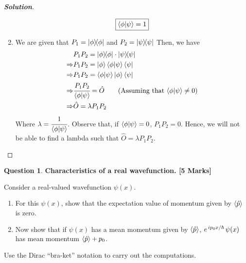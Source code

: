 \documentclass[10pt]{scrartcl}
\theoremstyle{definition}
\newtheorem{exercise}{Question}
\newenvironment{solution} {\begin{proof}[\normalfont \textbf{Solution}]} {\end{proof}}
\newcommand*{\OO}{\hat{O}}
\newcommand*{\Op}{\hat{p}}
\begin{document}
\begin{solution}
\begin{enumerate}[label={(\alph*)}]
            $$\boxed{\ip{\phi}{\psi} = 1}$$
        \item We are given that $P_1 = \op{\phi}$ and $P_2 = \op{\psi}{\psi}$ Then, we have
            \begin{align*}
                &P_1P_2 = \op{\phi}{\phi} \cdot \op{\psi}{\psi} \\
                \Rightarrow &P_1P_2 = \ket{\phi}\ip{\phi}{\psi}\bra{\psi} \\
                \Rightarrow &P_1P_2 = \ip{\phi}{\psi} \ket{\phi}\bra{\psi} \\
                \Rightarrow &\cfrac{P_1P_2}{\ip{\phi}{\psi}} = \OO \tag{Assuming that $\ip{\phi}{\psi} \neq 0$}\\
                \Rightarrow &\OO = \lambda P_1 P_2
            \end{align*}
            Where $\lambda = \cfrac{1}{\ip{\phi}{\psi}}$. Observe that, if $\ip{\phi}{\psi} = 0$, $P_1P_2 = 0$. Hence, we will not
            be able to find a lambda such that $\OO = \lambda P_1P_2$. 
    \end{enumerate}
\end{solution}
\begin{exercise}\textbf{Characteristics of a real wavefunction. [5 Marks]}

    Consider a real-valued wavefunction $\psi(x)$.
    \begin{enumerate}[label=(\alph*)]
        \item For this $\psi(x)$, show that the expectation value of momentum given by $\expval{\Op}$ is zero.

        \item Now show that if $\psi(x)$ has a mean momentum given by $\expval{\Op}$, $e^{\flatfrac{i p_0 x}{\hbar}} \psi(x)$ has mean momentum $\expval{\Op} + p_0$.
    \end{enumerate}
    Use the Dirac “bra-ket” notation to carry out the computations.
\end{exercise}
\end{document}
